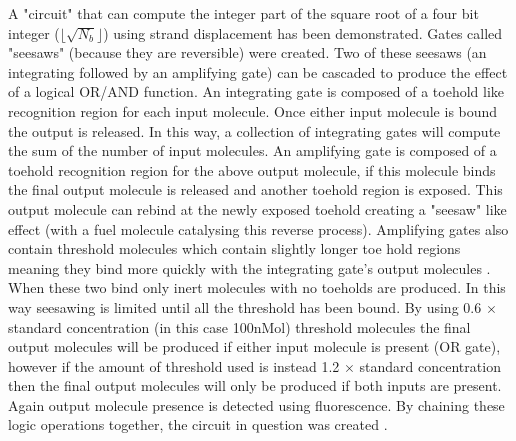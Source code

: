\documentclass[11pt,a4paper,portrait]{article}
\begin{document}
A "circuit" that can compute the integer part of the square root of a four bit integer ($\lfloor{\sqrt{N_b}}\rfloor$) using strand displacement has been demonstrated. Gates called "seesaws" (because they are reversible) were created. Two of these seesaws (an integrating followed by an amplifying gate) can be cascaded to produce the effect of a logical OR/AND function. An integrating gate is composed of a toehold like recognition region for each input molecule. Once either input molecule is bound the output is released. In this way, a collection of integrating gates will compute the sum of the number of input molecules. An amplifying gate is composed of a toehold recognition region for the above output molecule, if this molecule binds the final output molecule is released and another toehold region is exposed. This output molecule can rebind at the newly exposed toehold creating a "seesaw" like effect (with a fuel molecule catalysing this reverse process). Amplifying gates also contain threshold molecules which contain slightly longer toe hold regions meaning they bind more quickly with the integrating gate's output molecules \cite{Qian11}. When these two bind only inert molecules with no toeholds are produced. In this way seesawing is limited until all the threshold has been bound. By using 0.6 $\times$ standard concentration (in this case 100nMol) threshold molecules the final output molecules will be produced if either input molecule is present (OR gate), however if the amount of threshold used is instead 1.2 $\times$ standard concentration then the final output molecules will only be produced if both inputs are present. Again output molecule presence is detected using fluorescence. By chaining these logic operations together, the circuit in question was created \cite{Qian11}.

\clearpage
\end{document}
